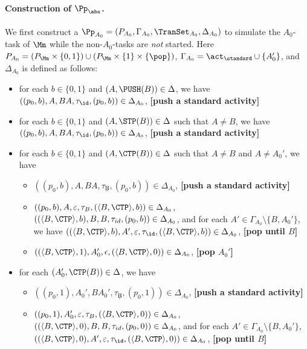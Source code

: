 \paragraph{Construction of $\Pp_{\abs}$.} 
We first construct a {\WOTrPDS} $\Pp_{A_0} = (P_{A_0},\Gamma_{A_0},\TranSet_{A_0},\Delta_{A_0})$ to simulate the $A_0$-task of $\Mm$ while the non-$A_0$-tasks are \emph{not} started. Here $P_{A_0} = (P_{\Mm}\times\{0,1\})\cup(P_{\Mm}\times\{1\}\times\{\pop\})$, $\Gamma_{A_0}=\act_{\standard}\cup\{A_0'\}$, and $\Delta_{A_0}$ is defined as follows:
\begin{itemize}
    \item for each $b\in\{0,1\}$ and $(A,\PUSH(B))\in\Delta$, we have $((p_0,b),A,BA,\tau_{\id},(p_0,b))\in\Delta_{A_0}$, \textbf{[push a standard activity]}
    \item for each $b\in\{0,1\}$ and $(A,\STP(B))\in\Delta$ such that $A\neq B$, we have $((p_0,b),A,BA,\tau_{\id},(p_0,b))\in\Delta_{A_0}$, \textbf{[push a standard activity]}
    \item for each $b\in\{0,1\}$ and $(A, \CTP(B)) \in \Delta$ such that $A \neq B$ and $A\neq A_0'$, we have
        \begin{itemize}
            \item $((p_0,b), A, BA, \tau_{\not B}, (p_0,b)) \in \Delta_{A_0}$, \textbf{[push a standard activity]}
            \item $((p_0,b), A, \varepsilon, \tau_{B}, (\langle B,\CTP\rangle,b)) \in \Delta_{A_0}$, $((\langle B, \CTP\rangle,b), B, B, \tau_{id}, (p_0,b))  \in \Delta_{A_0}$, 
        and for each $A' \in \Gamma_{A_0} \setminus \{B,A_0'\}$, we have $((\langle B, \CTP\rangle,b), A', \varepsilon, \tau_{\id}, (\langle B, \CTP\rangle,b)) \in \Delta_{A_0}$, \textbf{[pop until $B$]}
    \item $((\langle B,\CTP\rangle,1),A_0',\epsilon,(\langle B,\CTP\rangle,0))\in\Delta_{A_0}$, \textbf{[pop $A_0'$]}
        \end{itemize}
    \item for each $(A_0', \CTP(B)) \in \Delta$, we have 
        \begin{itemize}
            \item $((p_0,1), A_0', BA_0', \tau_{\not B}, (p_0,1)) \in \Delta_{A_0}$, \textbf{[push a standard activity]}
            \item $((p_0,1), A_0', \varepsilon, \tau_{B}, (\langle B,\CTP\rangle,0)) \in \Delta_{A_0}$, 
        $((\langle B, \CTP\rangle,0), B, B, \tau_{id}, (p_0,0))  \in \Delta_{A_0}$, and for each $A' \in \Gamma_{A_0} \setminus \{B,A_0'\}$, $((\langle B, \CTP\rangle,0), A', \varepsilon, \tau_{\id}, (\langle B, \CTP\rangle,0)) \in \Delta_{A_0}$, \textbf{[pop until $B$]}

\end{itemize}
\end{itemize}

